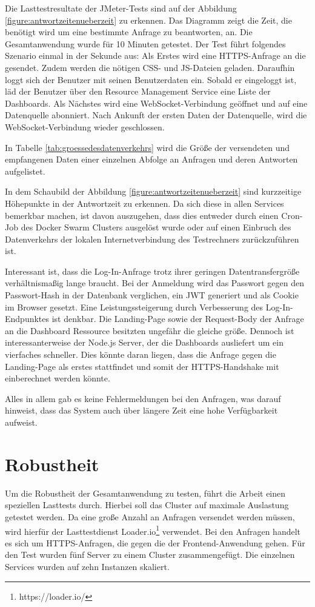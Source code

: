 Die Lasttestresultate der JMeter-Tests sind auf der Abbildung \ref{figure:antwortzeitenueberzeit}
zu erkennen. Das Diagramm zeigt die Zeit, die benötigt wird um eine bestimmte Anfrage zu beantworten, an.
Die Gesamtanwendung wurde für 10 Minuten getestet.
Der Test führt folgendes Szenario einmal in der Sekunde aus:
Als Erstes wird eine HTTPS-Anfrage an die  gesendet.
Zudem werden die nötigen CSS- und JS-Dateien geladen.
Daraufhin loggt sich der Benutzer mit seinen Benutzerdaten ein.
Sobald er eingeloggt ist, läd der Benutzer über den Resource Management Service
eine Liste der \foreignlanguage{english}{Dashboards}. Als Nächstes wird eine WebSocket-Verbindung geöffnet
und auf eine Datenquelle abonniert. Nach Ankunft der ersten Daten der
Datenquelle, wird die WebSocket-Verbindung wieder geschlossen.

In Tabelle \ref{tab:groessedesdatenverkehrs} wird die Größe der versendeten und empfangenen 
Daten einer einzelnen Abfolge an Anfragen und deren Antworten aufgelistet.

In dem Schaubild der Abbildung \ref{figure:antwortzeitenueberzeit}
sind kurzzeitige Höhepunkte in der Antwortzeit zu erkennen. Da sich diese
in allen Services bemerkbar machen, ist davon auszugehen, dass dies
entweder durch einen Cron-Job des Docker Swarm Clusters ausgelöst wurde oder auf einen
Einbruch des Datenverkehrs der lokalen Internetverbindung des Testrechners zurückzuführen
ist.

Interessant ist, dass die Log-In-Anfrage trotz ihrer geringen Datentransfergröße verhältnismaßig
lange braucht. Bei der Anmeldung wird das Passwort gegen den Passwort-Hash in der Datenbank verglichen,
ein JWT generiert und als Cookie im Browser gesetzt. Eine Leistungssteigerung durch Verbesserung
des Log-In-Endpunktes ist denkbar. Die Landing-Page  sowie der Request-Body der
Anfrage an die Dashboard Ressource besitzten ungefähr die gleiche größe. Dennoch ist interessanterweise
der Node.js Server, der die \foreignlanguage{english}{Dashboards} ausliefert um ein vierfaches schneller. Dies könnte daran liegen,
dass die Anfrage gegen die Landing-Page als erstes stattfindet und somit der HTTPS-Handshake
mit einberechnet werden könnte.

Alles in allem gab es keine Fehlermeldungen bei den Anfragen, was darauf hinweist, dass das System
auch über längere Zeit eine hohe Verfügbarkeit aufweist.

\section{Robustheit}
\label{sec:robustheit}
Um die Robustheit der Gesamtanwendung zu testen, führt die Arbeit
einen speziellen Lasttests durch. Hierbei soll das Cluster auf maximale
Auslastung getestet werden. Da eine große Anzahl an Anfragen versendet werden müssen,
wird hierfür der Lasttestdienst Loader.io\footnote{https://loader.io/} verwendet.
Bei den Anfragen handelt es sich um HTTPS-Anfragen, die gegen
die  der Frontend-Anwendung gehen. Für den Test
wurden fünf Server zu einem Cluster zusammengefügt. Die einzelnen Services wurden
auf zehn Instanzen skaliert.

